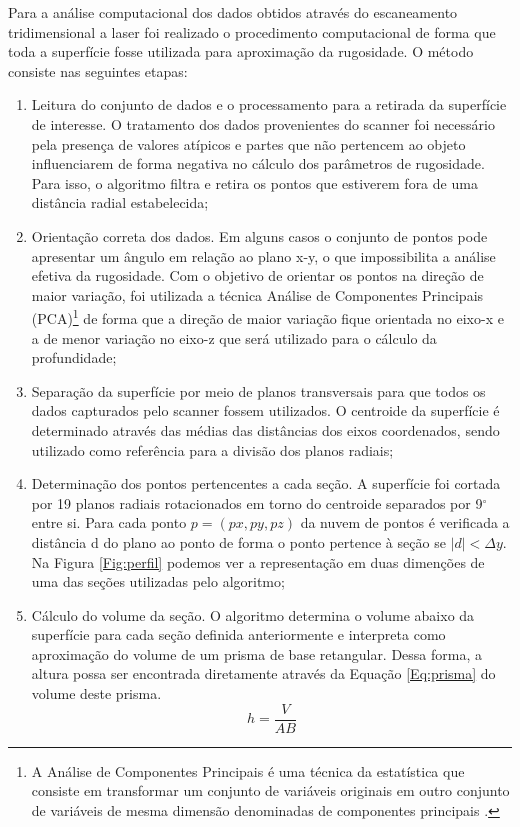 Para a análise computacional dos dados obtidos através do escaneamento tridimensional a laser foi realizado o procedimento computacional de forma que toda a superfície fosse utilizada para aproximação da rugosidade. O método consiste nas seguintes etapas:
\begin{enumerate}
\item Leitura do conjunto de dados e o processamento para a retirada da superfície de interesse. O tratamento dos dados provenientes do scanner foi necessário pela presença de valores atípicos e partes que não pertencem ao objeto influenciarem de forma negativa no cálculo dos parâmetros de rugosidade. Para isso, o algoritmo filtra e retira os pontos que estiverem fora de uma distância radial estabelecida;

\item Orientação correta dos dados. Em alguns casos o conjunto de pontos pode apresentar um ângulo em relação ao plano x-y, o que impossibilita a análise efetiva da rugosidade. Com o objetivo de orientar os pontos na direção de maior variação, foi utilizada a técnica Análise de Componentes Principais (PCA)\footnote{A Análise de Componentes Principais é uma técnica da estatística que
consiste em transformar um conjunto de variáveis originais em outro conjunto de variáveis
de mesma dimensão denominadas de componentes principais \cite{varella}.} de forma que a direção de maior variação fique orientada no eixo-x e a de menor variação no eixo-z que será utilizado para o cálculo da profundidade;

\item Separação da superfície por meio de planos transversais para que todos os dados capturados pelo scanner fossem utilizados. O centroide da superfície é determinado através das médias das distâncias dos eixos coordenados, sendo utilizado como referência para a divisão dos planos radiais;

\item Determinação dos pontos pertencentes a cada seção. A superfície foi cortada por 19 planos radiais rotacionados em torno do centroide separados por 9$^{\circ}$ entre si. Para cada ponto $p = (px, py, pz)$ da nuvem de pontos é verificada a distância d do plano ao ponto de forma o ponto pertence à seção se $|d|<\Delta y$. Na Figura \ref{Fig:perfil} podemos ver a representação em duas dimenções de uma das seções utilizadas pelo algoritmo;

\item Cálculo do volume da seção. O algoritmo determina o volume abaixo da superfície para cada seção definida anteriormente e interpreta como aproximação do volume de um prisma de base retangular. Dessa forma, a altura possa ser encontrada diretamente através da Equação \ref{Eq:prisma} do volume deste prisma.
\begin{equation}
\label{Eq:prisma}
h = \frac{V}{A B}
\end{equation}


\end{enumerate}
